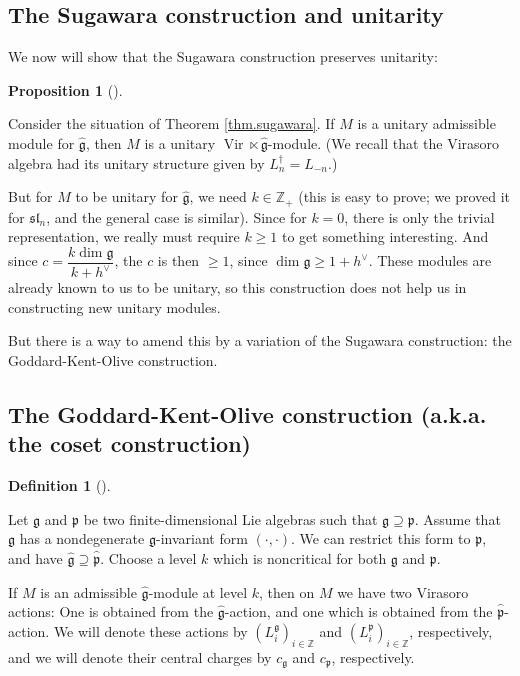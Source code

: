 \documentclass
[numbers=enddot,12pt,final,onecolumn,german,notitlepage]{scrartcl}%
\theoremstyle{definition}
\newtheorem{prop}[theo]{Proposition}
\newenvironment{proposition}[1][]
{\begin{prop}[#1]\begin{leftbar}}
{\end{leftbar}\end{prop}}
\newtheorem{defi}[theo]{Definition}
\newenvironment{definition}[1][]
{\begin{defi}[#1]\begin{leftbar}}
{\end{leftbar}\end{defi}}
\begin{document}
\subsection{The Sugawara construction and unitarity}

We now will show that the Sugawara construction preserves unitarity:

\begin{proposition}
Consider the situation of Theorem \ref{thm.sugawara}. If $M$ is a unitary
admissible module for $\widehat{\mathfrak{g}}$, then $M$ is a unitary
$\operatorname*{Vir}\ltimes\widehat{\mathfrak{g}}$-module. (We recall that the
Virasoro algebra had its unitary structure given by $L_{n}^{\dag}=L_{-n}$.)
\end{proposition}

But for $M$ to be unitary for $\widehat{\mathfrak{g}}$, we need $k\in
\mathbb{Z}_{+}$ (this is easy to prove; we proved it for $\mathfrak{sl}_{n}$,
and the general case is similar). Since for $k=0$, there is only the trivial
representation, we really must require $k\geq1$ to get something interesting.
And since $c=\dfrac{k\dim\mathfrak{g}}{k+h^{\vee}}$, the $c$ is then $\geq1$,
since $\dim\mathfrak{g}\geq1+h^{\vee}$. These modules are already known to us
to be unitary, so this construction does not help us in constructing new
unitary modules.

But there is a way to amend this by a variation of the Sugawara construction:
the Goddard-Kent-Olive construction.

\subsection{The Goddard-Kent-Olive construction (a.k.a. the coset
construction)}

\begin{definition}
Let $\mathfrak{g}$ and $\mathfrak{p}$ be two finite-dimensional Lie algebras
such that $\mathfrak{g}\supseteq\mathfrak{p}$. Assume that $\mathfrak{g}$ has
a nondegenerate $\mathfrak{g}$-invariant form $\left(  \cdot,\cdot\right)  $.
We can restrict this form to $\mathfrak{p}$, and have $\widehat{\mathfrak{g}%
}\supseteq\widehat{\mathfrak{p}}$. Choose a level $k$ which is noncritical for
both $\mathfrak{g}$ and $\mathfrak{p}$.

If $M$ is an admissible $\widehat{\mathfrak{g}}$-module at level $k$, then on
$M$ we have two Virasoro actions: One is obtained from the
$\widehat{\mathfrak{g}}$-action, and one which is obtained from the
$\widehat{\mathfrak{p}}$-action. We will denote these actions by $\left(
L_{i}^{\mathfrak{g}}\right)  _{i\in\mathbb{Z}}$ and $\left(  L_{i}%
^{\mathfrak{p}}\right)  _{i\in\mathbb{Z}}$, respectively, and we will denote
their central charges by $c_{\mathfrak{g}}$ and $c_{\mathfrak{p}}$, respectively.
\end{definition}
\end{document}
